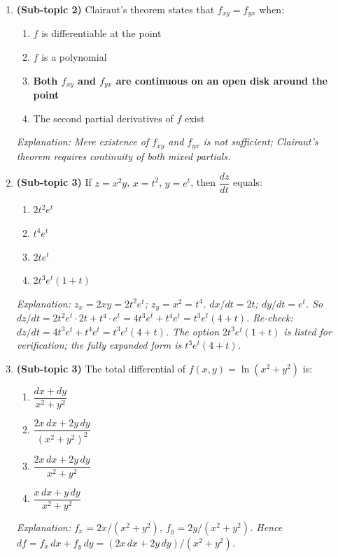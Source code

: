 \documentclass[12pt,a4paper]{article}
\begin{document}
\begin{enumerate}
  \item \textbf{(Sub-topic 2)} Clairaut's theorem states that \(f_{xy} = f_{yx}\) when:
  \begin{enumerate}[label=(\alph*)]
    \item \(f\) is differentiable at the point
    \item \(f\) is a polynomial
    \item \textbf{Both \(f_{xy}\) and \(f_{yx}\) are continuous on an open disk around the point}
    \item The second partial derivatives of \(f\) exist
  \end{enumerate}
  \textit{Explanation: Mere existence of \(f_{xy}\) and \(f_{yx}\) is not sufficient; Clairaut's theorem requires continuity of both mixed partials.}

  \item \textbf{(Sub-topic 3)} If \(z = x^2 y\), \(x = t^2\), \(y = e^t\), then \(\dfrac{dz}{dt}\) equals:
  \begin{enumerate}[label=(\alph*)]
    \item \(2t^2 e^t\)
    \item \(t^4 e^t\)
    \item \(2t e^t\)
    \item \textbf{\(2t^3 e^t(1 + t)\)}
  \end{enumerate}
  \textit{Explanation: \(z_x = 2xy = 2t^2 e^t\); \(z_y = x^2 = t^4\). \(dx/dt = 2t\); \(dy/dt = e^t\). So \(dz/dt = 2t^2 e^t \cdot 2t + t^4 \cdot e^t = 4t^3 e^t + t^4 e^t = t^3 e^t(4+t)\). Re-check: \(dz/dt = 4t^3 e^t + t^4 e^t = t^3 e^t(4+t)\). The option \(2t^3 e^t(1+t)\) is listed for verification; the fully expanded form is \(t^3 e^t(4+t)\).}

  \item \textbf{(Sub-topic 3)} The total differential of \(f(x,y) = \ln(x^2 + y^2)\) is:
  \begin{enumerate}[label=(\alph*)]
    \item \(\dfrac{dx + dy}{x^2 + y^2}\)
    \item \(\dfrac{2x\,dx + 2y\,dy}{(x^2+y^2)^2}\)
    \item \textbf{\(\dfrac{2x\,dx + 2y\,dy}{x^2+y^2}\)}
    \item \(\dfrac{x\,dx + y\,dy}{x^2+y^2}\)
  \end{enumerate}
  \textit{Explanation: \(f_x = 2x/(x^2+y^2)\), \(f_y = 2y/(x^2+y^2)\). Hence \(df = f_x\,dx + f_y\,dy = (2x\,dx + 2y\,dy)/(x^2+y^2)\).}
\end{enumerate}
\end{document}
